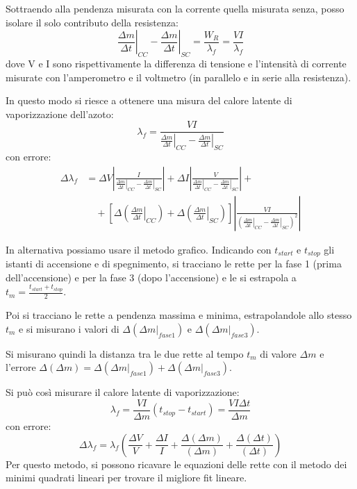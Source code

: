 \documentclass[a4paper,12pt]{article}
\begin{document}
Sottraendo alla pendenza misurata con la corrente quella misurata senza, posso isolare il solo
contributo della resistenza:
\begin{equation*}
    \left. \frac{\Delta m}{\Delta t} \right|_{CC} - \left. \frac{\Delta m}{\Delta t} \right|_{SC} = \frac{W_R}{\lambda_f} = \frac{V I}{\lambda_f}
\end{equation*}
dove V e I sono rispettivamente la differenza di tensione e l'intensità di corrente misurate con
l'amperometro e il voltmetro (in parallelo e in serie alla resistenza).

In questo modo si riesce a ottenere una misura del calore latente di vaporizzazione dell'azoto:
\begin{equation*}
    \lambda_f = \frac{V I}{\left. \frac{\Delta m}{\Delta t} \right|_{CC} - \left. \frac{\Delta m}{\Delta t} \right|_{SC}}
\end{equation*}
con errore:
\begin{align*}
    \Delta \lambda_f &= \Delta V \left| \frac{I}{\left. \frac{\Delta m}{\Delta t} \right|_{CC} - \left. \frac{\Delta m}{\Delta t} \right|_{SC}} \right| + \Delta I \left| \frac{V}{\left. \frac{\Delta m}{\Delta t} \right|_{CC} - \left. \frac{\Delta m}{\Delta t} \right|_{SC}} \right| + \\
    &\quad + \left[ \Delta\left(\left. \frac{\Delta m}{\Delta t} \right|_{CC}\right) + \Delta \left( \left. \frac{\Delta m}{\Delta t} \right|_{SC} \right) \right] \left| \frac{VI}{\left( \left. \frac{\Delta m}{\Delta t} \right|_{CC} - \left. \frac{\Delta m}{\Delta t} \right|_{SC} \right)^2} \right|
\end{align*}

In alternativa possiamo usare il metodo grafico.
Indicando con $t_{start}$ e $t_{stop}$ gli istanti di accensione e di spegnimento, si tracciano le
rette per la fase 1 (prima dell'accensione) e per la fase 3 (dopo l'accensione) e le si estrapola
a $t_m = \frac{t_{start} + t_{stop}}{2}$.

Poi si tracciano le rette a pendenza massima e minima, estrapolandole allo stesso $t_m$ e
si misurano i valori di $\Delta \left( \left.\Delta m \right|_{fase 1} \right)$ e $\Delta \left( \left.\Delta m \right|_{fase 3} \right)$.

Si misurano quindi la distanza tra le due rette al tempo $t_m$ di valore $\Delta m$ e l'errore $\Delta \left( \Delta m \right) = \Delta \left( \left.\Delta m \right|_{fase 1} \right) + \Delta \left( \left.\Delta m \right|_{fase 3} \right)$.

Si può così misurare il calore latente di vaporizzazione:
\begin{equation*}
    \lambda_f = \frac{V I}{\Delta m} (t_{stop} - t_{start}) = \frac{V I \Delta t}{\Delta m}
\end{equation*}
con errore:
\begin{equation*}
    \Delta \lambda_f = \lambda_f \left( \frac{\Delta V}{V} + \frac{\Delta I}{I} + \frac{\Delta (\Delta m)}{(\Delta m)} + \frac{\Delta (\Delta t)}{(\Delta t)} \right)
\end{equation*}
Per questo metodo, si possono ricavare le equazioni delle rette con il metodo dei minimi quadrati
lineari per trovare il migliore fit lineare.
\end{document}
